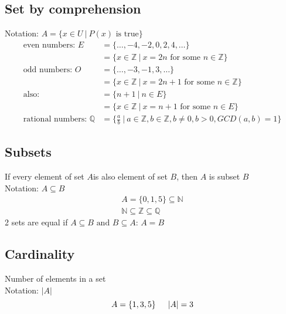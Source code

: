 \documentclass{article}
\begin{document}
\subsection{Set by comprehension}
Notation: $A = \{x \in U \ | \ P(x) \text{ is true}\}$
\begin{align*}
    \text{even numbers: } E              & = \{\ldots, -4, -2,0,2,4,\dots \}                                                          \\
                                         & = \{x \in \mathbb{Z} \ | \ x = 2n \text{ for some } n \in \mathbb{Z} \}                    \\
    \text{odd numbers: } O               & = \{\dots,-3,-1,3,\dots \}                                                                 \\
                                         & = \{x \in \mathbb{Z} \ | \ x = 2n+1 \text{ for some } n \in \mathbb{Z} \}                  \\
    \text{also: }                        & =  \{n+1 \ | \ n \in E \}                                                                  \\
                                         & = \{x \in \mathbb{Z} \ | \ x = n+1 \text{ for some } n \in E \}                            \\
    \text{rational numbers: } \mathbb{Q} & = \{\frac{a}{b} \ | \ a \in \mathbb{Z}, b \in \mathbb{Z}, b \neq 0, b > 0, GCD(a,b) = 1 \}
\end{align*}

\subsection{Subsets}
If every element of set $A$is also element of set $B$, then $A$ is subset $B$ \\
Notation: $A \subseteq B$
\begin{gather*}
    A = \{0,1,5\} \subseteq \mathbb{N} \\
    \mathbb{N} \subseteq \mathbb{Z} \subseteq \mathbb{Q}
\end{gather*}
2 sets are equal if $A \subseteq B \text{ and } B \subseteq A$: $A = B$

\subsection{Cardinality}
Number of elements in a set \\
Notation: $\lvert A \rvert$
\[
    A = \{1,3,5\} \text{\indent } \lvert A \rvert = 3
\]
\end{document}
